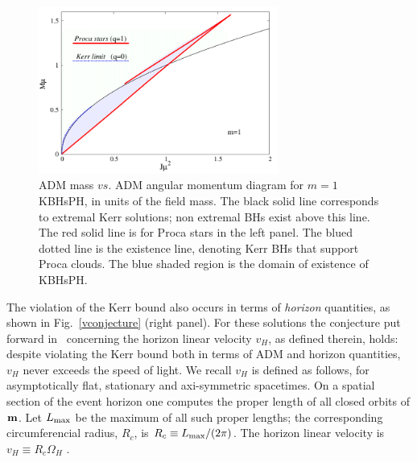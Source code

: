\begin{figure}[h!]
  \begin{center}
    \includegraphics[width=0.7\textwidth]{papers/Proca/BH-J-M.pdf}
  \end{center}
  \caption{ADM mass $vs.$ ADM angular momentum diagram for $m=1$ KBHsPH, in units of the field mass. The black solid line corresponds to extremal Kerr solutions; non extremal BHs exist above this line. The red solid line is for Proca stars in the left panel. The blued dotted line is the existence line, denoting Kerr BHs that support Proca clouds. The blue shaded region is the domain of existence of KBHsPH.}
  \label{fig2}
\end{figure}
 

The violation of the Kerr bound also occurs in terms of \textit{horizon} quantities, as shown in Fig.~\ref{vconjecture} (right panel). For these solutions the conjecture put forward in~\cite{Herdeiro:2015moa} concerning the horizon linear velocity $v_H$, as defined therein, holds: despite violating the Kerr bound both in terms of ADM and horizon quantities, $v_H$ never exceeds the speed of light.  We recall $v_H$ is defined as follows, for asymptotically flat, stationary and axi-symmetric spacetimes. On a spatial section of the event horizon one computes the proper length of all closed orbits of ${\bf m}$. Let $L_{\rm max}$ be the maximum of all such proper lengths; the corresponding circumferencial radius, $R_c$, is $R_c\equiv {L_{\rm max}}/({2\pi})$. 
The horizon linear velocity is $v_H \equiv R_c \Omega_H$ \cite{Herdeiro:2015moa}.

